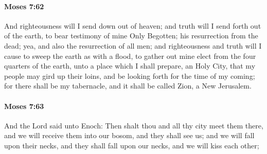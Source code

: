
		\paragraph{Moses 7:62} %
			\label{MOSES-7-62}

			And righteousness will I send down out of heaven; and truth will I send forth out of the earth, to bear testimony of mine Only Begotten; his resurrection from the dead; yea, and also the resurrection of all men; and righteousness and truth will I cause to sweep the earth as with a flood, to gather out mine elect from the four quarters of the earth, unto a place which I shall prepare, an Holy City, that my people may gird up their loins, and be looking forth for the time of my coming; for there shall be my tabernacle, and it shall be called Zion, a New Jerusalem.


		\paragraph{Moses 7:63} %
			\label{MOSES-7-63}

			And the Lord said unto Enoch: Then shalt thou and all thy city meet them there, and we will receive them into our bosom, and they shall see us; and we will fall upon their necks, and they shall fall upon our necks, and we will kiss each other;


